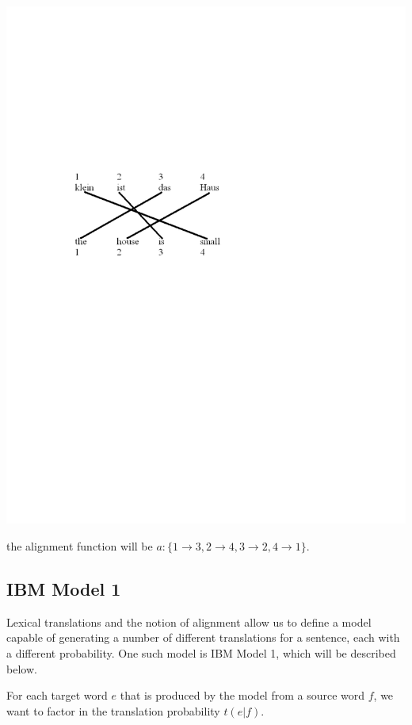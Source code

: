 \documentclass[11pt]{report}
\theoremstyle{plain}
\begin{document}
{\begin{center}
\includegraphics[viewport = 100 400 400 550,clip,scale=0.5]{constantin-figure2.pdf}
\end{center}

the alignment function will be
$a:\{1 \rightarrow 3, 2 \rightarrow 4, 3 \rightarrow 2, 4
\rightarrow 1\}$.

\subsection{IBM Model 1}

Lexical translations and the notion of alignment allow us to define
a model capable of generating a number of different translations for
a sentence, each with a different probability. One such model is IBM
Model 1, which will be described below.

For each target word $e$ that is produced by the model from a source
word $f$, we want to factor in the translation probability $t(e|f)$.

}
\end{document}
